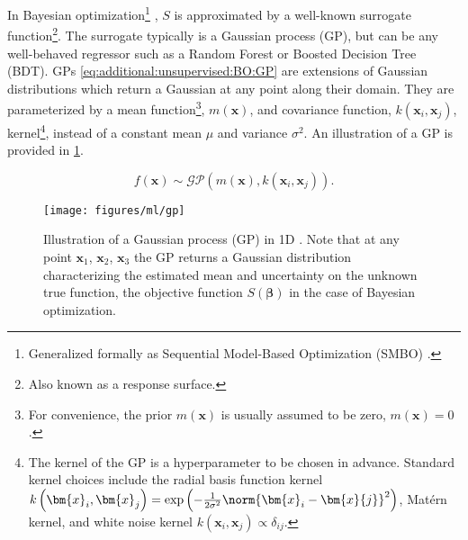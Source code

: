 In Bayesian optimization\footnote{Generalized
formally as Sequential Model-Based Optimization (SMBO) \cite{NIPS2011_4443}.} \cite{Brochu2010,1301.1942,Borisyak,NIPS2011_4443},
$S$ is approximated by a well-known surrogate function\footnote{Also known as a response surface.}.
The surrogate typically is a Gaussian process (GP),
but can be any well-behaved regressor such as
a Random Forest or Boosted Decision Tree (BDT).
GPs \cref{eq:additional:unsupervised:BO:GP} are
extensions of Gaussian distributions which return a Gaussian at any point along their domain.
They are parameterized by a mean function\footnote{For convenience,
the prior $m\left(\bm{x}\right)$ is usually assumed to be zero, $m\left(\bm{x}\right)=0$.}, $m\left(\bm{x}\right)$,
and covariance function, $k\left(\bm{x}_{i}, \bm{x}_{j}\right)$,
\ie kernel\footnote{The kernel of the GP is a hyperparameter to be chosen in advance.
Standard kernel choices include
the radial basis function kernel $k\left(\bm{x}_{i}, \bm{x}_{j}\right) = \exp\left(-\frac{1}{2\sigma^{2}}\norm{\bm{x}_{i}-\bm{x}{j}}^{2}\right)$,
Mat\'{e}rn kernel,
and white noise kernel $k\left(\bm{x}_{i}, \bm{x}_{j}\right) \propto \delta_{ij}$.},
instead of a constant mean $\mu$ and variance $\sigma^{2}$.
An illustration of a GP is provided in \cref{fig:additional:unsupervised:BO:GP_ex}.

\begin{equation}\label{eq:additional:unsupervised:BO:GP}
f\left(\bm{x}\right) \sim \mathcal{GP}\left(m\left(\bm{x}\right), k\left(\bm{x}_{i}, \bm{x}_{j}\right)\right).
\end{equation}

\begin{figure}[H] %
\centering
\texttt{[image: figures/ml/gp]}
\caption{
Illustration of a Gaussian process (GP) in 1D \cite{Brochu2010}.
Note that at any point $\bm{x}_{1}$, $\bm{x}_{2}$, $\bm{x}_{3}$ the GP
returns a Gaussian distribution characterizing the estimated mean and uncertainty on the
unknown true function, \ie the objective function $S\left(\bm{\beta}\right)$ in the case of Bayesian optimization.
}
\label{fig:additional:unsupervised:BO:GP_ex}
\end{figure}

